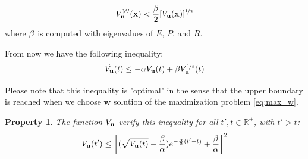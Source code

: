 \documentclass{article}
\newtheorem{property}{Property}
\theoremstyle{named}
\newcommand{\propsymbol}{\( \blacklozenge \)}
\newenvironment{prop}[0]
    {\begin{samepage}
    \begin{property}
    \renewcommand{\qedsymbol}{\propsymbol}\pushQED{\qed}
    }
    {
    \popQED %
    \end{property} 
    \end{samepage}
    }
\newcommand{\vect}[1]{\ensuremath{ \mathbf{#1}}}
\begin{document}
\begin{equation}
\Vwu(\vect{x}) < \frac{\Bu}{2} [\Vu(\vect{x})]^{\nicefrac{1}{2}}
\end{equation}
where $\beta$ is computed with eigenvalues of $E$, $P$, and $R$.

From now we have the following inequality:
\begin{equation}
\dot{\Vu}(t) \leq -\alpha \Vu(t) + \Bu \Vu^{\nicefrac{1}{2}}(t)
\end{equation}

Please note that this inequality is "optimal" in the sense that the upper boundary is reached when  we choose $\vect{w}$ solution of the maximization problem \ref{eq:max_w}.

\begin{prop} \label{ineq:lyap}
The function $\Vu$ verify this inequality for all $t',t \in \mathbb{R}^+$, with $t'>t$:
\begin{equation}
\Vu(t') \leq  \left[ (\sqrt{\Vu(t)} - \frac{\Bu}{\alpha}) e^{-\frac{\alpha}{2} (t'-t)} + \frac{\Bu}{\alpha} \right] ^2
\end{equation} 
\end{prop}
\end{document}
